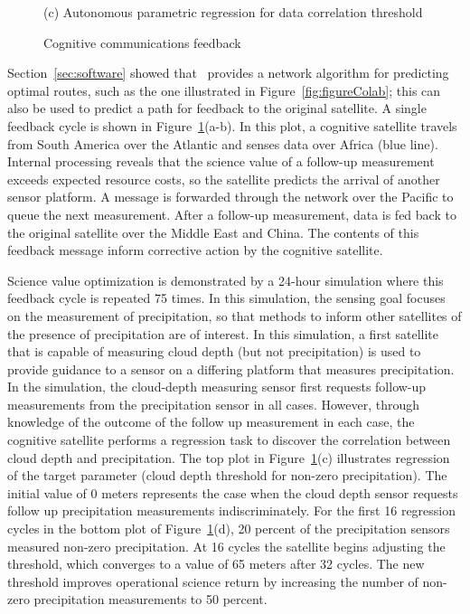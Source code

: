 \documentclass[conference]{IEEEtran}
\newcommand{\project}{{\sc{Collaborate}}~}
\begin{document}
\begin{figure}[b!]
\begin{minipage}[b]{\linewidth}
\begin{center}
      {\footnotesize(c) Autonomous parametric regression for data correlation
        threshold}
    \end{center}
  \end{minipage}
  \caption{Cognitive communications feedback}
  \label{fig:feedback}
\end{figure}

Section~\ref{sec:software} showed that \project provides a network algorithm for
predicting optimal routes, such as the one illustrated in
Figure~\ref{fig:figureColab}; this can also be used to predict a path for
feedback to the original satellite.  A single feedback cycle is shown in
Figure~\ref{fig:feedback}(a-b).  In this plot, a cognitive satellite travels
from South America over the Atlantic and senses data over Africa (blue line).
Internal processing reveals that the science value of a follow-up measurement
exceeds expected resource costs, so the satellite predicts the arrival of
another sensor platform.  A message is forwarded through the network over the
Pacific to queue the next measurement.  After a follow-up measurement, data is
fed back to the original satellite over the Middle East and China.  The contents
of this feedback message inform corrective action by the cognitive satellite.

Science value optimization is demonstrated by a 24-hour simulation where this
feedback cycle is repeated 75 times.  In this simulation, the sensing goal focuses on
the measurement of precipitation, so that methods to inform other satellites of the
presence of precipitation are of interest. In this simulation, a first satellite
that is capable of measuring cloud depth (but not precipitation) is used to
provide guidance to a sensor on a differing platform that measures precipitation.
In the simulation, the cloud-depth measuring sensor first requests follow-up
measurements from the precipitation sensor in all cases. However, through
knowledge of the outcome of the follow up measurement in each case, the cognitive
satellite performs a regression task to discover the correlation between cloud
depth and precipitation.  The top plot in Figure~\ref{fig:feedback}(c)
illustrates regression of the target parameter (cloud depth threshold for
non-zero precipitation).  The initial value of 0 meters represents the case when
the cloud depth sensor requests follow up precipitation measurements indiscriminately.  For
the first 16 regression cycles in the bottom plot of
Figure~\ref{fig:feedback}(d), 20 percent of the precipitation sensors measured
non-zero precipitation.  At 16 cycles the satellite begins adjusting the
threshold, which converges to a value of 65 meters after 32 cycles.  The new
threshold improves operational science return by increasing the number of
non-zero precipitation measurements to 50 percent.
\end{document}
